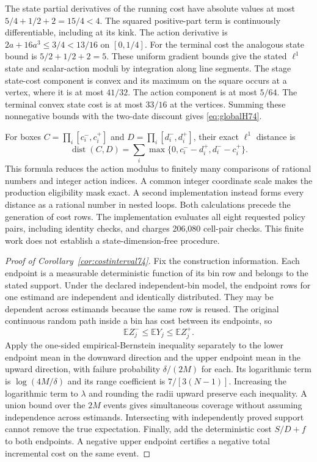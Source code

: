 The state partial derivatives of the running cost have absolute values at most $5/4+1/2+2=15/4<4$. The squared positive-part term is continuously differentiable, including at its kink. The action derivative is $2a+16a^3\le3/4<13/16$ on $[0,1/4]$. For the terminal cost the analogous state bound is $5/2+1/2+2=5$. These uniform gradient bounds give the stated $\ell^1$ state and scalar-action moduli by integration along line segments. The stage state-cost component is convex and its maximum on the square occurs at a vertex, where it is at most $41/32$. The action component is at most $5/64$. The terminal convex state cost is at most $33/16$ at the vertices. Summing these nonnegative bounds with the two-date discount gives \eqref{eq:globalH74}.

For boxes $C=\prod_i[c_i^-,c_i^+]$ and $D=\prod_i[d_i^-,d_i^+]$, their exact $\ell^1$ distance is
\[
 \operatorname{dist}(C,D)=\sum_i\max\{0,c_i^- -d_i^+,d_i^- -c_i^+\}.
\]
This formula reduces the action modulus to finitely many comparisons of rational numbers and integer action indices. A common integer coordinate scale makes the production eligibility mask exact. A second implementation instead forms every distance as a rational number in nested loops. Both calculations precede the generation of cost rows. The implementation evaluates all eight requested policy pairs, including identity checks, and charges 206,080 cell-pair checks. This finite work does not establish a state-dimension-free procedure.

\begin{proof}[Proof of Corollary~\ref{cor:costinterval74}]
Fix the construction information. Each endpoint is a measurable deterministic function of its bin row and belongs to the stated support. Under the declared independent-bin model, the endpoint rows for one estimand are independent and identically distributed. They may be dependent across estimands because the same row is reused. The original continuous random path inside a bin has cost between its endpoints, so
\[
 \mathbb E Z_j^-\le\mathbb E Y_j\le\mathbb E Z_j^+.
\]
Apply the one-sided empirical-Bernstein inequality separately to the lower endpoint mean in the downward direction and the upper endpoint mean in the upward direction, with failure probability $\delta/(2M)$ for each. Its logarithmic term is $\log(4M/\delta)$ and its range coefficient is $7/[3(N-1)]$. Increasing the logarithmic term to $\lambda$ and rounding the radii upward preserve each inequality. A union bound over the $2M$ events gives simultaneous coverage without assuming independence across estimands. Intersecting with independently proved support cannot remove the true expectation. Finally, add the deterministic cost $S/D+f$ to both endpoints. A negative upper endpoint certifies a negative total incremental cost on the same event.
\end{proof}

